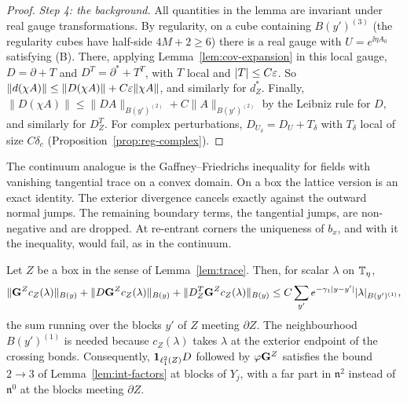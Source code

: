 \begin{proof}
\emph{Step 4: the background.} All quantities in the lemma are invariant under real gauge transformations. By regularity, on a cube containing $B(y')^{(3)}$ (the regularity cubes have half-side $4M+2\ge6$) there is a real gauge with $U=e^{\ii\eta A_0}$ satisfying (B). There, applying Lemma~\ref{lem:cov-expansion} in this local gauge, $D=\partial+T$ and $D^T=\partial^*+T^T$, with $T$ local and $|T|\le C\varepsilon$. So $\|d(\chi A)\|\le\|D(\chi A)\|+C\varepsilon\|\chi A\|$, and similarly for $d^*_Z$. Finally, $\|D(\chi A)\|\le\|DA\|_{B(y')^{(2)}}+C\|A\|_{B(y')^{(2)}}$ by the Leibniz rule for $D$, and similarly for $D^T_Z$. For complex perturbations, $D_{U_\delta}=D_U+T_\delta$ with $T_\delta$ local of size $C\delta_c$ (Proposition~\ref{prop:reg-complex}).
\end{proof}

The continuum analogue is the Gaffney--Friedrichs inequality for fields with vanishing tangential trace on a convex domain. On a box the lattice version is an exact identity. The exterior divergence cancels exactly against the outward normal jumps. The remaining boundary terms, the tangential jumps, are non-negative and are dropped. At re-entrant corners the uniqueness of $b_x$, and with it the inequality, would fail, as in the continuum.

\begin{lemma}\label{lem:cut-term}
Let $Z$ be a box in the sense of Lemma~\ref{lem:trace}. Then, for scalar $\lambda$ on $\mathbb T_\eta$,
\[
\|\mathbf G^{Z}c_Z(\lambda)\|_{B(y)}+\|D\mathbf G^{Z}c_Z(\lambda)\|_{B(y)}+\|D^T_Z\mathbf G^Zc_Z(\lambda)\|_{B(y)}\le C\sum_{y'}e^{-\gamma_1|y-y'|}|\lambda|_{B(y')^{(1)}},
\]
the sum running over the blocks $y'$ of $Z$ meeting $\partial Z$. The neighbourhood $B(y')^{(1)}$ is needed because $c_Z(\lambda)$ takes $\lambda$ at the exterior endpoint of the crossing bonds. Consequently, $\mathbf 1_{\ell^2_1(Z)}D$ followed by $\varphi\mathbf G^Z$ satisfies the bound $2\to3$ of Lemma~\ref{lem:int-factors} at blocks of $Y_j$, with a far part in $\mathfrak n^2$ instead of $\mathfrak n^0$ at the blocks meeting $\partial Z$.
\end{lemma}

